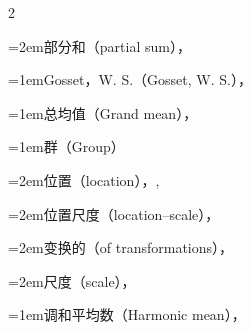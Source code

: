 \begin{multicols}{2}
\par\noindent\hangindent=2em\hspace*{1em}\label{idx:460}部分和（partial sum），\hyperref[eq:1.5.4]{\pageref*{eq:1.5.4}}\par
\par\addvspace{2pt}
\par\noindent\hangindent=1em\hspace*{0em}\label{idx:461}Gosset，W. S.（Gosset, W. S.），\hyperref[idxocc:461:212]{\pageref*{idxocc:461:212}}\par
\par\addvspace{2pt}
\par\noindent\hangindent=1em\hspace*{0em}\label{idx:462}总均值（Grand mean），\hyperref[idxocc:462:457]{\pageref*{idxocc:462:457}}\par
\par\addvspace{2pt}
\par\noindent\hangindent=1em\hspace*{0em}\label{idx:463}群（Group）\par
\par\noindent\hangindent=2em\hspace*{1em}\label{idx:464}位置（location），\hyperref[ex:6.4.6]{\pageref*{ex:6.4.6}}, \hyperref[ex:7.3.6]{\pageref*{ex:7.3.6}}\par
\par\noindent\hangindent=2em\hspace*{1em}\label{idx:465}位置尺度（location–scale），\hyperref[exercise:6.42]{\pageref*{exercise:6.42}}\par
\par\noindent\hangindent=2em\hspace*{1em}\label{idx:466}变换的（of transformations），\hyperref[def:6.4.2]{\pageref*{def:6.4.2}}\par
\par\noindent\hangindent=2em\hspace*{1em}\label{idx:467}尺度（scale），\hyperref[exercise:6.43]{\pageref*{exercise:6.43}}\par
\par\addvspace{2pt}
\par\noindent\hangindent=1em\hspace*{0em}\label{idx:468}调和平均数（Harmonic mean），\hyperref[ex:4.7.8]{\pageref*{ex:4.7.8}}\par

\end{multicols}
